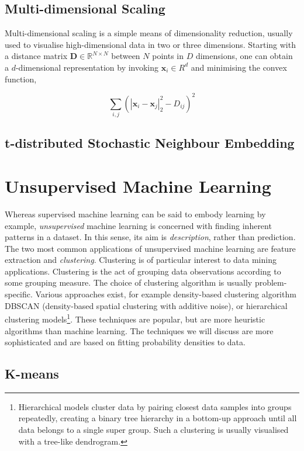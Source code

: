 \documentclass[11pt]{amsart}
\begin{document}
\subsection{Multi-dimensional Scaling}

Multi-dimensional scaling is a simple means of dimensionality reduction, usually used to visualise high-dimensional data in two or three dimensions. Starting with a distance matrix $\mathbf{D} \in \mathbb{R}^{N\times N}$ between $N$ points in $D$ dimensions, one can obtain a $d$-dimensional representation by invoking $\mathbf{x}_i \in R^{d}$ and minimising the convex function, 

$$\sum_{i, j} (|\mathbf{x}_i - \mathbf{x}_j|_2^2 - D_{ij})^2$$

\subsection{t-distributed Stochastic Neighbour Embedding}

\section{Unsupervised Machine Learning}

Whereas supervised machine learning can be said to embody learning by example, \emph{unsupervised} machine learning is concerned with finding inherent patterns in a dataset. In this sense, its aim is \emph{description}, rather than prediction. The two most common applications of unsupervised machine learning are feature extraction and \emph{clustering}. Clustering is of particular interest to data mining applications. Clustering is the act of grouping data observations according to some grouping measure. The choice of clustering algorithm is usually problem-specific. Various approaches exist, for example density-based clustering algorithm DBSCAN (density-based spatial clustering with additive noise), or hierarchical clustering models\footnote{Hierarchical models cluster data by pairing closest data samples into groups repeatedly, creating a binary tree hierarchy in a bottom-up approach until all data belongs to a single super group. Such a clustering is usually visualised with a tree-like dendrogram.}. These techniques are popular, but are more heuristic algorithms than machine learning. The techniques we will discuss are more sophisticated and are based on fitting probability densities to data.

\subsection{K-means}
\end{document}
